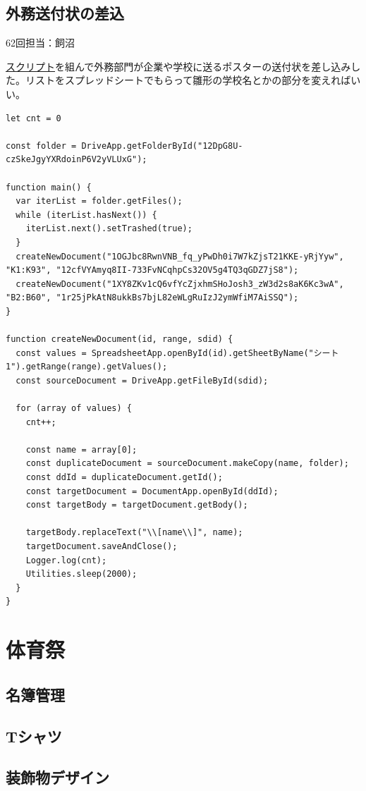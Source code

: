 \documentclass[dvipdfmx,jb5]{jreport}
\newcommand{\Chapter}[1]{\chapter{#1}\thispagestyle{fancy}}
\begin{document}
\section{外務送付状の差込}\label{sec:外務送付状の差込}
62回担当：飼沼

\href{https://script.google.com/d/1peO_Bmf9jcnJWGCZMN2IRhBrCqokkgPmUVuC4BlryH9kxAiHoXzkjO_x/edit?usp=sharing}{スクリプト}を組んで外務部門が企業や学校に送るポスターの送付状を差し込みした。リストをスプレッドシートでもらって雛形の学校名とかの部分を変えればいい。
\lstset{language=JavaScript}
\begin{lstlisting}
let cnt = 0

const folder = DriveApp.getFolderById("12DpG8U-czSkeJgyYXRdoinP6V2yVLUxG");

function main() {
  var iterList = folder.getFiles();
  while (iterList.hasNext()) {
    iterList.next().setTrashed(true);
  }
  createNewDocument("1OGJbc8RwnVNB_fq_yPwDh0i7W7kZjsT21KKE-yRjYyw", "K1:K93", "12cfVYAmyq8II-733FvNCqhpCs32OV5g4TQ3qGDZ7jS8");
  createNewDocument("1XY8ZKv1cQ6vfYcZjxhmSHoJosh3_zW3d2s8aK6Kc3wA", "B2:B60", "1r25jPkAtN8ukkBs7bjL82eWLgRuIzJ2ymWfiM7AiSSQ");
}

function createNewDocument(id, range, sdid) {
  const values = SpreadsheetApp.openById(id).getSheetByName("シート1").getRange(range).getValues();
  const sourceDocument = DriveApp.getFileById(sdid);

  for (array of values) {
    cnt++;

    const name = array[0];
    const duplicateDocument = sourceDocument.makeCopy(name, folder);
    const ddId = duplicateDocument.getId();
    const targetDocument = DocumentApp.openById(ddId);
    const targetBody = targetDocument.getBody();

    targetBody.replaceText("\\[name\\]", name);
    targetDocument.saveAndClose();
    Logger.log(cnt);
    Utilities.sleep(2000);
  }
}
\end{lstlisting}

\Chapter{体育祭}
\section{名簿管理}
\section{Tシャツ}
\section{装飾物デザイン}
\end{document}
